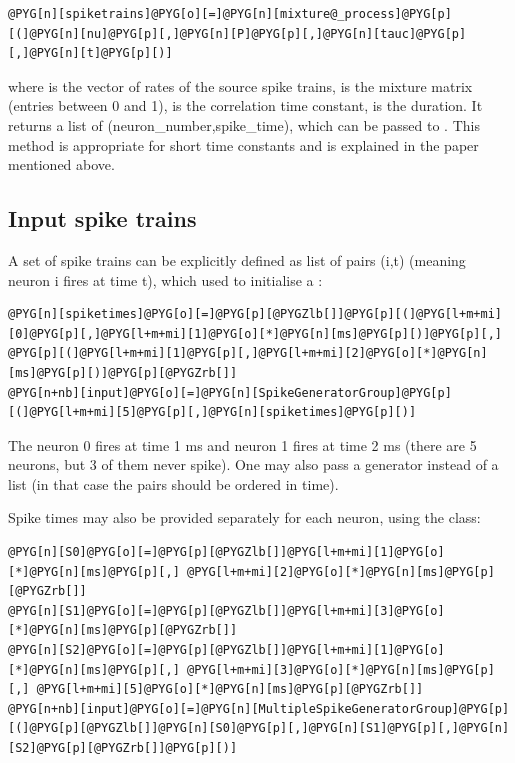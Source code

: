 \documentclass[letterpaper,10pt,english]{manual}
\begin{document}
\begin{Verbatim}[commandchars=@\[\]]
@PYG[n][spiketrains]@PYG[o][=]@PYG[n][mixture@_process]@PYG[p][(]@PYG[n][nu]@PYG[p][,]@PYG[n][P]@PYG[p][,]@PYG[n][tauc]@PYG[p][,]@PYG[n][t]@PYG[p][)]
\end{Verbatim}

where  is the vector of rates of the source spike trains,
 is the mixture matrix (entries between 0 and 1),
 is the correlation time constant,
 is the duration. It returns a list of
(neuron\_number,spike\_time), which can be passed to
. This method is appropriate for short time constants and is explained
in the paper mentioned above.


\subsection{Input spike trains}

A set of spike trains can be explicitly defined as list of pairs (i,t)
(meaning neuron i fires at time t), which used to initialise a
\hyperlink{brian.SpikeGeneratorGroup}{}:

\begin{Verbatim}[commandchars=@\[\]]
@PYG[n][spiketimes]@PYG[o][=]@PYG[p][@PYGZlb[]]@PYG[p][(]@PYG[l+m+mi][0]@PYG[p][,]@PYG[l+m+mi][1]@PYG[o][*]@PYG[n][ms]@PYG[p][)]@PYG[p][,] @PYG[p][(]@PYG[l+m+mi][1]@PYG[p][,]@PYG[l+m+mi][2]@PYG[o][*]@PYG[n][ms]@PYG[p][)]@PYG[p][@PYGZrb[]]
@PYG[n+nb][input]@PYG[o][=]@PYG[n][SpikeGeneratorGroup]@PYG[p][(]@PYG[l+m+mi][5]@PYG[p][,]@PYG[n][spiketimes]@PYG[p][)]
\end{Verbatim}

The neuron 0 fires at time 1 ms and neuron 1 fires at time 2 ms (there are 5 neurons,
but 3 of them never spike).
One may also pass a generator instead of a list (in that case the pairs should be
ordered in time).

Spike times may also be provided separately for each neuron, using the
\hyperlink{brian.MultipleSpikeGeneratorGroup}{} class:

\begin{Verbatim}[commandchars=@\[\]]
@PYG[n][S0]@PYG[o][=]@PYG[p][@PYGZlb[]]@PYG[l+m+mi][1]@PYG[o][*]@PYG[n][ms]@PYG[p][,] @PYG[l+m+mi][2]@PYG[o][*]@PYG[n][ms]@PYG[p][@PYGZrb[]]
@PYG[n][S1]@PYG[o][=]@PYG[p][@PYGZlb[]]@PYG[l+m+mi][3]@PYG[o][*]@PYG[n][ms]@PYG[p][@PYGZrb[]]
@PYG[n][S2]@PYG[o][=]@PYG[p][@PYGZlb[]]@PYG[l+m+mi][1]@PYG[o][*]@PYG[n][ms]@PYG[p][,] @PYG[l+m+mi][3]@PYG[o][*]@PYG[n][ms]@PYG[p][,] @PYG[l+m+mi][5]@PYG[o][*]@PYG[n][ms]@PYG[p][@PYGZrb[]]
@PYG[n+nb][input]@PYG[o][=]@PYG[n][MultipleSpikeGeneratorGroup]@PYG[p][(]@PYG[p][@PYGZlb[]]@PYG[n][S0]@PYG[p][,]@PYG[n][S1]@PYG[p][,]@PYG[n][S2]@PYG[p][@PYGZrb[]]@PYG[p][)]
\end{Verbatim}
\end{document}
